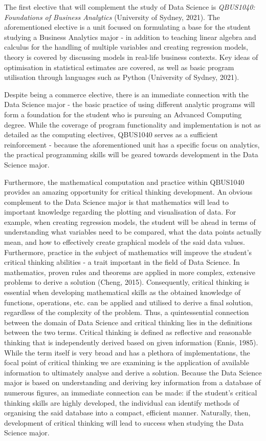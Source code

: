 The first elective that will complement the study of Data Science is \textit{QBUS1040: Foundations of Business Analytics} (University of Sydney, 2021). The aforementioned elective is a unit focused on formulating a base for the student studying a Business Analytics major - in addition to teaching linear algebra and calculus for the handling of multiple variables and creating regression models, theory is covered by discussing models in real-life business contexts. Key ideas of optimisation in statistical estimates are covered, as well as basic program utilisation through languages such as Python (University of Sydney, 2021). 


Despite being a commerce elective, there is an immediate connection with the Data Science major - the basic practice of using different analytic programs will form a foundation for the student who is pursuing an Advanced Computing degree. While the coverage of program functionality and implementation is not as detailed as the computing electives, QBUS1040 serves as a sufficient reinforcement - because the aforementioned unit has a specific focus on analytics, the practical programming skills will be geared towards development in the Data Science major. 


Furthermore, the mathematical computation and practice within QBUS1040 provides an amazing opportunity for critical thinking development. An obvious complement to the Data Science major is that mathematics will lead to important knowledge regarding the plotting and visualisation of data. For example, when creating regression models, the student will be ahead in terms of understanding what variables need to be compared, what the data points actually mean, and how to effectively create graphical models of the said data values. Furthermore, practice in the subject of mathematics will improve the student’s critical thinking abilities - a trait important in the field of Data Science. In mathematics, proven rules and theorems are applied in more complex, extensive problems to derive a solution (Cheng, 2015). Consequently, critical thinking is essential when developing mathematical skills as the obtained knowledge of functions, operations, etc. can be applied and utilised to derive a final solution, regardless of the complexity of the problem. Thus, a quintessential connection between the domain of Data Science and critical thinking lies in the definitions between the two terms. Critical thinking is defined as reflective and reasonable thinking that is independently derived based on given information (Ennis, 1985). While the term itself is very broad and has a plethora of implementations, the focal point of critical thinking we are examining is the application of available information to ultimately analyse and derive a solution. Because the Data Science major is based on understanding and deriving key information from a database of numerous figures, an immediate connection can be made: if the student’s critical thinking skills are highly developed, the individual can identify methods of organising the said database into a compact, efficient manner. Naturally, then, development of critical thinking will lead to success when studying the Data Science major.


